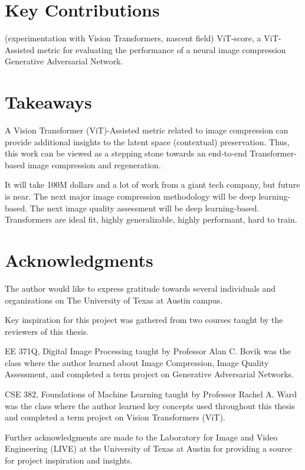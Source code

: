 \section{Key Contributions}

(experimentation with Vision Transformers, nascent field)
ViT-score, a ViT-Assisted metric for evaluating the performance of a neural image compression
Generative Adversarial Network.


\section{Takeaways}

A Vision Transformer (ViT)-Assisted metric related to image compression can provide 
additional insights to the latent space (contextual) preservation.
Thus, this work can be viewed as a stepping stone towards an end-to-end Transformer-based
image compression and regeneration.

It will take 100M dollars and a lot of work from a giant tech company, but
future is near. The next major image compression methodology will be deep learning-based.
The next image quality assessment will be deep learning-based.
Transformers are ideal fit, highly generalizable, highly performant, hard to train.


\section{Acknowledgments}

The author would like to express gratitude towards several individuals and organizations
on The University of Texas at Austin campus.


Key inspiration for this project was gathered from two courses taught by the
reviewers of this thesis.


EE 371Q, Digital Image Processing taught by Professor Alan C. Bovik was the class
where the author learned about 
Image Compression, Image Quality Assessment, and completed a term
project on Generative Adversarial Networks.


CSE 382, Foundations of Machine Learning taught by Professor Rachel A. Ward 
was the class where the author learned key concepts used throughout this thesis
and completed a term project on Vision Transformers (ViT).


Further acknowledgments are made to the Laboratory for Image and Video Engineering (LIVE) at the 
University of Texas at Austin for providing a source for project inspiration and insights.


